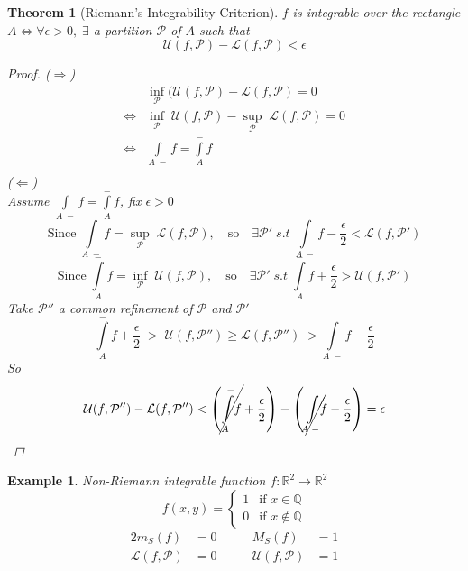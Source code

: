 \documentclass[12pt]{article}
\def\QQ{\mathbb{Q}}
\def\RR{\mathbb{R}}
\newtheorem{theorem}{Theorem}[section]
\newtheorem{example}{Example}[section]
\begin{document}
\begin{theorem}[Riemann's Integrability Criterion]\label{reimann}
$f$ is integrable over the rectangle $A \Leftrightarrow \forall  \epsilon > 0, \; \exists$ a partition $\mathcal{P}$ of $A$ such that 
\[\mathcal{U}(f, \mathcal{P}) - \mathcal{L}(f, \mathcal{P}) < \epsilon \]
\begin{proof}
($ \Rightarrow $)\\
\begin{align*}
&\inf_{\mathcal{P}}(\mathcal{U}(f, \mathcal{P}) - \mathcal{L}(f, \mathcal{P}) = 0\\
\Leftrightarrow &\inf_{\mathcal{P}}\;\mathcal{U}(f, \mathcal{P}) - \sup_{\mathcal{P}}\; \mathcal{L}(f, \mathcal{P}) = 0\\
\Leftrightarrow  &\int\limits_{A \;-}f = \int\limits_{A}^{-}f\\
\end{align*}
($\Leftarrow$)\\
Assume $\int\limits_{A \;-}f = \int\limits_{A}^{-}f$, fix $\epsilon > 0$
\[\text{Since} \; \int\limits_{A \;-}\! f = \sup_{\mathcal{P}} \;\mathcal{L}(f, \mathcal{P}), \quad \text{so} \quad \exists \mathcal{P}' \; s.t \; \int\limits_{A \;-}f - \frac{\epsilon}{2} < \mathcal{L}(f, \mathcal{P}')\]
\[\text{Since} \; \int\limits_{A}^{-}f = \inf_{\mathcal{P}} \;\mathcal{U}(f, \mathcal{P}), \quad \text{so} \quad \exists \mathcal{P}' \; s.t \; \int\limits_{A}^{-}f + \frac{\epsilon}{2} > \mathcal{U}(f, \mathcal{P}')\]
Take $\mathcal{P}''$ a common refinement of $\mathcal{P}$ and $\mathcal{P}'$
\[\int\limits_{A}^{-}f + \frac{\epsilon}{2} \;>\; \mathcal{U}(f, \mathcal{P}'') \geq \mathcal{L}(f, \mathcal{P}'') \;> \int\limits_{A \;-}f - \frac{\epsilon}{2}\]
So
\[\mathcal{U}(f, \mathcal{P}'') - \mathcal{L}(f, \mathcal{P}'') < \left(\cancel{\int\limits_{A}^{-}\!f} + \frac{\epsilon}{2}\right) - \left(\cancel{\int\limits_{A \;-}\!\!f} - \frac{\epsilon}{2}\right) = \epsilon\]
\end{proof}
\end{theorem}

\begin{example} Non-Riemann integrable function $f:\RR^2 \rightarrow \RR^2$
\[f(x,y) =
  \begin{cases}
  1 & \text{if } x \in \QQ \\
   0      & \text{if } x \notin \QQ
  \end{cases} \]
\begin{alignat*}{2}
m_S(f) &= 0 &\qquad M_S(f)&=1\\
\mathcal{L}(f, \mathcal{P}) &= 0 &\qquad \mathcal{U}(f, \mathcal{P}) &=1
\end{alignat*}
\end{example}
\end{document}
